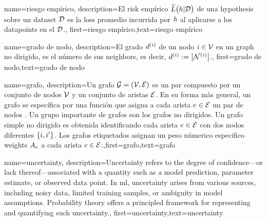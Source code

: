 {name={riesgo empírico},
 description={El \gls{risk} empírico $\widehat{L}\big(h|\mathcal{D}\big)$ 
 	de una \gls{hypothesis} sobre un \gls{dataset} $\mathcal{D}$ es la \gls{loss} promedio incurrida 
 	por $h$ al aplicarse a los \gls{datapoint}s en el $\mathcal{D}$.},
 first={riesgo empírico},text={riesgo empírico} 
}

{name={grado de nodo},
	description={El grado $d^{(i)}$ de un nodo $i \in \mathcal{V}$ 
		en un \gls{graph} no dirigido, es el número de sus \gls{neighbors}, es decir, $d^{(i)} := \big|\mathcal{N}^{(i)}\big|$.},
		first={grado de nodo},text={grado de nodo} 
}


{name={grafo},
	description={Un grafo $\mathcal{G} = \left( \mathcal{V},\mathcal{E} \right)$ es un par compuesto por un  
		conjunto de nodos $\mathcal{V}$ y un conjunto de aristas $\mathcal{E}$. En su forma màs general, un grafo se 
		específica por una función que asigna a cada arista $e \in \mathcal{E}$ un par de nodos \cite{RockNetworks}. 
		Un grupo importante de grafos son los grafos no dirigidos. Un grafo simple no dirigido  
		es obtenida identificando cada arista $e \in \mathcal{E}$ con dos nodos diferentes $\{i,i'\}$. 
		Los grafos etiquetados asignan un peso númerico especifico \gls{weights} $A_{e}$ a cada 
		arista $e \in \mathcal{E}$.},first={grafo},text={grafo} 
}

{name={uncertainty},
	description={Uncertainty refers to the degree of confidence—or 
		lack thereof—associated with a quantity such as a model prediction, parameter estimate, or 
		observed data point. In \gls{ml}, uncertainty arises from various sources, including 
		noisy data, limited training samples, or ambiguity in model assumptions. Probability theory 
		offers a principled framework for representing and quantifying such uncertainty.},
	first={uncertainty},text={uncertainty}
}

